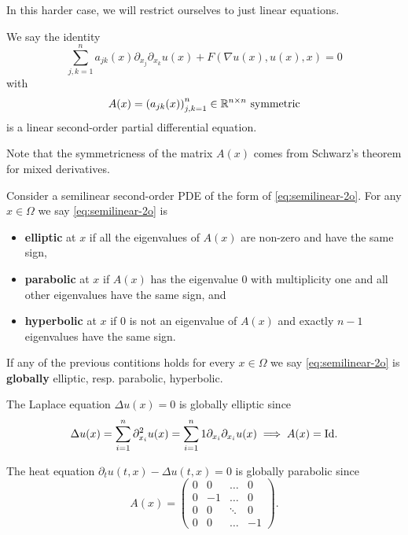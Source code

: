 In this harder case, we will restrict ourselves to just linear equations.

\begin{dfn}

  We say the identity
  \begin{equation}
    \label{eq:semilinear-2o}
    \sum_{j, k = 1}^n a_{jk}(x) \partial_{x_j} \partial_{x_k} u(x)
    + F(\nabla u(x), u(x), x) = 0
  \end{equation}
  with
  \[
    A(x) = \left( a_{jk}(x) \right)_{j, k = 1}^n \in \mathbb{R}^{n \times n} \text{ symmetric}
  \]
  is a linear second-order partial differential equation.
\end{dfn}

Note that the symmetricness of the matrix $A(x)$ comes from Schwarz's theorem
for mixed derivatives.

\begin{dfn}
  Consider a semilinear second-order PDE of the form of
  \eqref{eq:semilinear-2o}. For any $x \in \Omega$ we say
  \eqref{eq:semilinear-2o} is
  \begin{itemize}
    \item \textbf{elliptic} at $x$ if all the eigenvalues of $A(x)$ are
      non-zero and have the same sign,
    \item \textbf{parabolic} at $x$ if $A(x)$ has the eigenvalue 0 with
      multiplicity one and all other eigenvalues have the same sign, and
    \item \textbf{hyperbolic} at $x$ if 0 is not an eigenvalue of $A(x)$ and
      exactly $n - 1$ eigenvalues have the same sign.
  \end{itemize}

  If any of the previous contitions holds for every $x \in \Omega$ we say
  \eqref{eq:semilinear-2o} is \textbf{globally} elliptic, resp. parabolic,
  hyperbolic.
\end{dfn}

\begin{eg}
  The Laplace equation $\Delta u(x) = 0$ is globally elliptic since
  \[
    \Delta u(x) = \sum_{i = 1}^n \partial^2_{x_i} u(x)
    = \sum_{i = 1}^n 1 \partial_{x_i} \partial_{x_i} u(x)
    \implies A(x) = \text{Id}.
  \]
\end{eg}

\begin{eg}
  The heat equation $\partial_t u(t, x) - \Delta u(t, x) = 0$ is globally
  parabolic since
  \[
    A(x) =
    \left(
      \begin{array}{c|ccc}
        0 & 0 & \dots & 0 \\ \hline
        0 & -1 & \dots & 0 \\
        0 & 0 & \ddots & 0 \\
        0 & 0 & \dots & -1
      \end{array}
    \right).
  \]
\end{eg}

